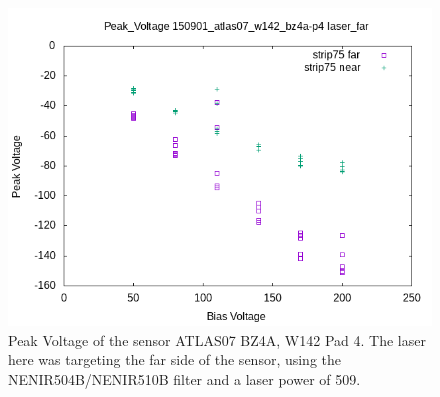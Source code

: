 \documentclass{report}
\begin{document}
            \begin{figure}[h] 
                \includegraphics[height=.4\textheight]{Peak_Voltage__150901_atlas07_w142_bz4a-p4__laser_far}
                \centering
                \caption{ Peak Voltage of the sensor ATLAS07 BZ4A, W142 Pad 4. The laser here was targeting the far side of the sensor, using the NENIR504B/NENIR510B filter and a laser power of 509. }
                \label{fig:Peak_Voltage__150901_atlas07_w142_bz4a-p4__laser_far}
            \end{figure}
\end{document}
